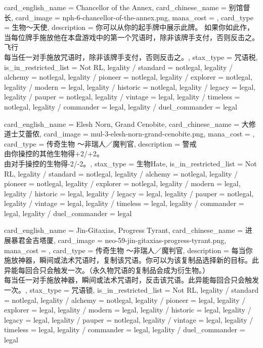\documentclass[lang = cn, color = black, 10pt]{AllThatStax}
\begin{document}
\card
{
	card_english_name = {Chancellor of the Annex},
	card_chinese_name = {别馆督长},
	card_image = nph-6-chancellor-of-the-annex.png,
	mana_cost = ,
	card_type = 生物～天使,
	description = {你可以从你的起手牌中展示此牌。 如果你如此作，当每位牌手施放他在本盘游戏中的第一个咒语时，除非该牌手支付，否则反击之。\\
		飞行\\
		每当任一对手施放咒语时，除非该牌手支付，否则反击之。},
	stax_type = 咒语税,
	is_in_restricted_list = Not RL,
	legality / standard = notlegal,
	legality / alchemy = notlegal,
	legality / pioneer = notlegal,
	legality / explorer = notlegal,
	legality / modern = legal,
	legality / historic = notlegal,
	legality / legacy = legal,
	legality / pauper = notlegal,
	legality / vintage = legal,
	legality / timeless = notlegal,
	legality / commander = legal,
	legality / duel_commander = legal
}

\card
{
	card_english_name = {Elesh Norn, Grand Cenobite},
	card_chinese_name = {大修道士艾蕾侬},
	card_image = mul-3-elesh-norn-grand-cenobite.png,
	mana_cost = ,
	card_type = 传奇生物 ～非瑞人／魔判官,
	description = {警戒\\
		由你操控的其他生物得+2/+2。\\
		由对手操控的生物得-2/-2。},
	stax_type = 生物Hate,
	is_in_restricted_list = Not RL,
	legality / standard = notlegal,
	legality / alchemy = notlegal,
	legality / pioneer = notlegal,
	legality / explorer = notlegal,
	legality / modern = legal,
	legality / historic = legal,
	legality / legacy = legal,
	legality / pauper = notlegal,
	legality / vintage = legal,
	legality / timeless = legal,
	legality / commander = legal,
	legality / duel_commander = legal
}

\card
{
	card_english_name = {Jin-Gitaxias, Progress Tyrant},
	card_chinese_name = {进展暴君金吉塔厦},
	card_image = neo-59-jin-gitaxias-progress-tyrant.png,
	mana_cost = ,
	card_type = 传奇生物 ～非瑞人／魔判官,
	description = {每当你施放神器，瞬间或法术咒语时，复制该咒语。你可以为该复制品选择新的目标。此异能每回合只会触发一次。（永久物咒语的复制品会成为衍生物。）\\
		每当任一对手施放神器，瞬间或法术咒语时，反击该咒语。此异能每回合只会触发一次。},
	stax_type = 咒语锁,
	is_in_restricted_list = Not RL,
	legality / standard = notlegal,
	legality / alchemy = notlegal,
	legality / pioneer = legal,
	legality / explorer = legal,
	legality / modern = legal,
	legality / historic = legal,
	legality / legacy = legal,
	legality / pauper = notlegal,
	legality / vintage = legal,
	legality / timeless = legal,
	legality / commander = legal,
	legality / duel_commander = legal
}
\end{document}
